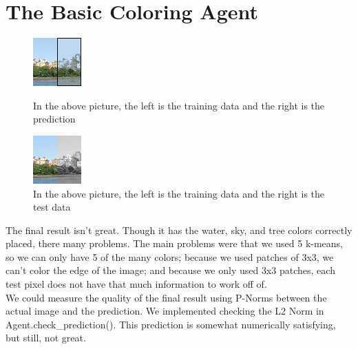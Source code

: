 \documentclass[12pt]{report}
\begin{document}
\section*{The Basic Coloring Agent}
\begin{figure}
\includegraphics[width=.5\textwidth]{Basic Agent Prediction}
\caption{In the above picture, the left is the training data and the right is the prediction}
\includegraphics[width=.5\textwidth]{Test Image}
\caption{In the above picture, the left is the training data and the right is the test data}
\end{figure}
The final result isn't great. Though it has the water, sky, and tree colors correctly placed, there many problems. The main problems were that we used 5 k-means, so we can only have 5 of the many colors; because we used patches of 3x3, we can't color the edge of the image; and because we only used 3x3 patches, each test pixel does not have that much information to work off of.\\
We could measure the quality of the final result using P-Norms between the actual image and the prediction. We implemented checking the L2 Norm in Agent.check\_prediction(). This prediction is somewhat numerically satisfying, but still, not great.
\end{document}
